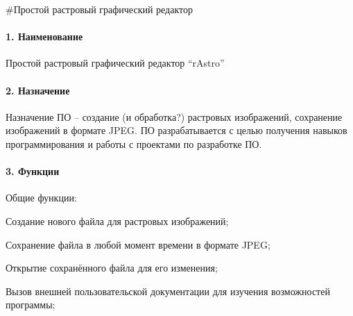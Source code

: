\#Простой растровый графический редактор \paragraph*{1. Наименование}

Простой растровый графический редактор “r\+Astro”

\paragraph*{2. Назначение}

Назначение ПО – создание (и обработка?) растровых изображений, сохранение изображений в формате J\+P\+E\+G. ПО разрабатывается с целью получения навыков программирования и работы с проектами по разработке ПО.

\paragraph*{3. Функции}

Общие функции\+:
\begin{DoxyItemize}
\item Создание нового файла для растровых изображений;
\item Сохранение файла в любой момент времени в формате J\+P\+E\+G;
\item Открытие сохранённого файла для его изменения;
\item Вызов внешней пользовательской документации для изучения возможностей программы;
\end{DoxyItemize}

